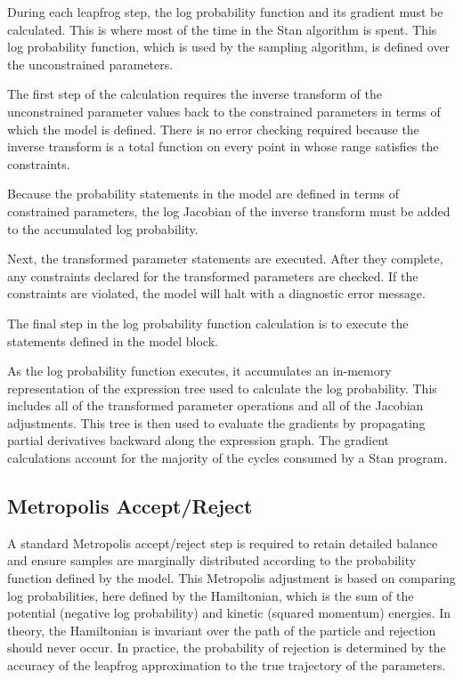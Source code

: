 During each leapfrog step, the log probability function and its
gradient must be calculated.  This is where most of the time in the
Stan algorithm is spent.  This log probability function, which is
used by the sampling algorithm, is defined over the unconstrained
parameters.

The first step of the calculation requires the inverse transform of
the unconstrained parameter values back to the constrained parameters
in terms of which the model is defined.  There is no error checking
required because the inverse transform is a total function on every point
in whose range satisfies the constraints.

Because the probability statements in the model are defined in terms
of constrained parameters, the log Jacobian of the inverse transform
must be added to the accumulated log probability.

Next, the transformed parameter statements are executed.  After they
complete, any constraints declared for the transformed parameters are
checked.  If the constraints are violated, the model will halt with a
diagnostic error message.

The final step in the log probability function calculation is to
execute the statements defined in the model block.

As the log probability function executes, it accumulates an in-memory
representation of the expression tree used to calculate the log
probability.  This includes all of the transformed parameter
operations and all of the Jacobian adjustments.  This tree is then
used to evaluate the gradients by propagating partial derivatives
backward along the expression graph.  The gradient calculations
account for the majority of the cycles consumed by a Stan program.

\subsection{Metropolis Accept/Reject}

A standard Metropolis accept/reject step is required to retain detailed
balance and ensure samples are marginally distributed according to the
probability function defined by the model.  This Metropolis adjustment
is based on comparing log probabilities, here defined by the
Hamiltonian, which is the sum of the potential (negative log
probability) and kinetic (squared momentum) energies.  In theory, the
Hamiltonian is invariant over the path of the particle and rejection
should never occur.  In practice, the probability of rejection is
determined by the accuracy of the leapfrog approximation to the true
trajectory of the parameters.

